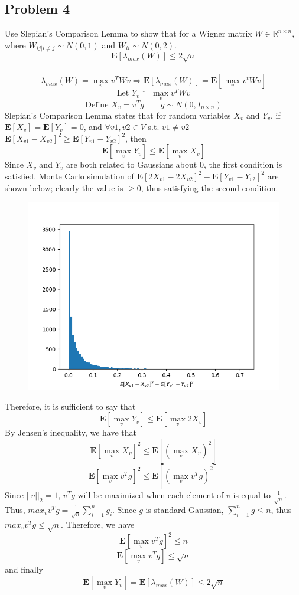 \documentclass{amsart}
\begin{document}
	\subsection{Problem 4}
	Use Slepian's Comparison Lemma to show that for a Wigner matrix $W\in \mathbb{R}^{n \times n}$, where $W_{ij | i\neq j} \sim N(0,1)$ and $W_{ii} \sim N(0,2)$.
	\\
	\[
	\mathbf{E}\left[\lambda_{max}(W)\right] \leq 2\sqrt{n}
	\]
	\\
	\[
	\lambda_{max}(W) = \max_v v^T W v \Rightarrow \mathbf{E}\left[\lambda_{max}(W)\right] = \mathbf{E}\left[\max_v v^t W v\right]
	\]
	\[
	\text{Let } Y_v \ddot{=} \max_v v^T W v 
	\]
	\[
	\text{Define } X_v = v^Tg \qquad g \sim N(0,I_{n\times n})
	\]
	Slepian's Comparison Lemma states that for random variables $X_v$ and $Y_v$, if $\mathbf{E}[X_v]=\mathbf{E}[Y_v]=0$, and $\forall v1, v2 \in V$ s.t. $v1 \neq v2$ $\mathbf{E}[X_{v1}-X_{v2}]^2 \geq \mathbf{E}[Y_{v1}-Y_{v2}]^2$, then
	\[
	\mathbf{E}\left[\max_v Y_v\right] \leq \mathbf{E}\left[\max_v X_v\right]
	\]
	Since $X_v$ and $Y_v$ are both related to Gaussians about 0, the first condition is satisfied. Monte Carlo simulation of $\mathbf{E}[2X_{v1}-2X_{v2}]^2 - \mathbf{E}[Y_{v1}-Y_{v2}]^2$ are shown below; clearly the value is $\geq 0$, thus satisfying the second condition.
	\begin{figure}[h!]
		\includegraphics[scale=0.6]{subtract.png}
	\end{figure}
	Therefore, it is sufficient to say that \[\mathbf{E}\left[\max_v Y_v\right] \leq \mathbf{E}\left[\max_v 2X_v\right]\]
	By Jensen's inequality, we have that
	\[
	\mathbf{E}\left[\max_v X_v\right]^2 \leq \mathbf{E}\left[\left(\max_v X_v\right)^2\right]
	\]
	\[
	\mathbf{E}\left[\max_v v^Tg\right]^2 \leq \mathbf{E}\left[\left(\max_v v^Tg\right)^2\right]
	\]
	Since $||v||_2=1$, $v^Tg$ will be maximized when each element of $v$ is equal to $\frac{1}{\sqrt{n}}$. Thus, $max_v v^Tg = \frac{1}{\sqrt{n}}\sum_{i=1}^n g_i$. Since $g$ is standard Gaussian, $\sum_{i=1}^{n}g \leq n$, thus $max_v v^Tg \leq \sqrt{n}$. Therefore, we have 
	\[
	\mathbf{E}\left[\max_v v^Tg\right]^2 \leq n
	\]
	\[
	\mathbf{E}\left[\max_v v^Tg\right] \leq \sqrt{n}
	\]
	and finally
	\[
	\mathbf{E}[\max_v Y_v] = \mathbf{E}[\lambda_{max}(W)] \leq 2\sqrt{n}
	\]
\end{document}
